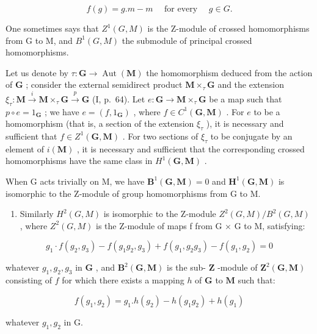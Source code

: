 \[
f (g) = g. m - m \quad \text { for   every } \quad g \in G.
\]

One sometimes says that \(Z^{1}(G, M)\) is the Z-module of crossed homomorphisms from G to M, and \(B^{1}(G, M)\) the submodule of principal crossed homomorphisms.

Let us denote by \(\tau: \mathbf{G} \to \operatorname{Aut}(\mathbf{M})\) the homomorphism deduced from the action of \(\mathbf{G}\) ; consider the external semidirect product \(\mathbf{M} \times_{\tau} \mathbf{G}\) and the extension \(\xi_{\tau}: \mathbf{M} \xrightarrow{i} \mathbf{M} \times_{\tau} \mathbf{G} \xrightarrow{p} \mathbf{G}\) (I, p.~64). Let \(e: \mathbf{G} \to \mathbf{M} \times_{\tau} \mathbf{G}\) be a map such that \(p \circ e = 1_{\mathbf{G}}\) ; we have \(e = (f, 1_{\mathbf{G}})\) , where \(f \in C^{1}(\mathbf{G}, \mathbf{M})\) . For \(e\) to be a homomorphism (that is, a section of the extension \(\xi_{\tau}\) ), it is necessary and sufficient that \(f \in Z^{1}(\mathbf{G}, \mathbf{M})\) . For two sections of \(\xi_{\tau}\) to be conjugate by an element of \(i(\mathbf{M})\) , it is necessary and sufficient that the corresponding crossed homomorphisms have the same class in \(H^{1}(\mathbf{G}, \mathbf{M})\) .

When G acts trivially on M, we have \(\mathbf{B}^{1}(\mathbf{G},\mathbf{M})=0\) and \(\mathbf{H}^{1}(\mathbf{G},\mathbf{M})\) is isomorphic to the Z-module of group homomorphisms from G to M.

\begin{enumerate}
\def\labelenumi{\arabic{enumi})}
\setcounter{enumi}{2}
\tightlist
\item
  Similarly \(H^{2}(G, M)\) is isomorphic to the Z-module \(Z^{2}(G, M)/B^{2}(G, M)\) , where \(Z^{2}(G, M)\) is the Z-module of maps f from G × G to M, satisfying:
\end{enumerate}

\[
g _ {1} \cdot f (g _ {2}, g _ {3}) - f (g _ {1} g _ {2}, g _ {3}) + f (g _ {1}, g _ {2} g _ {3}) - f (g _ {1}, g _ {2}) = 0
\]

whatever \(g_{1}, g_{2}, g_{3}\) in \(\mathbf{G}\) , and \(\mathbf{B}^{2}(\mathbf{G}, \mathbf{M})\) is the sub- \(\mathbf{Z}\) -module of \(\mathbf{Z}^{2}(\mathbf{G}, \mathbf{M})\) consisting of \(f\) for which there exists a mapping \(h\) of \(\mathbf{G}\) to \(\mathbf{M}\) such that:

\[
f (g _ {1}, g _ {2}) = g _ {1}. h (g _ {2}) - h (g _ {1} g _ {2}) + h (g _ {1})
\]

whatever \(g_{1}, g_{2}\) in G.

